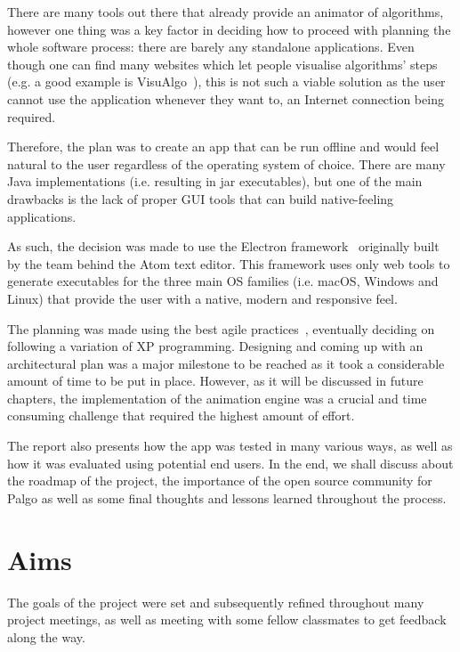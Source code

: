 \documentclass{l4proj}
\begin{document}
There are many tools out there that already provide an animator of algorithms, however one thing was a key factor in deciding
how to proceed with planning the whole software process: there are barely any standalone applications. Even though one
can find many websites which let people visualise algorithms' steps (e.g. a good example is VisuAlgo~\cite{visualgo}), this is not such a viable solution as the user cannot use the application whenever they want to, an Internet connection being required.

Therefore, the plan was to create an app that can be run offline and would feel natural to the user regardless of the operating system of choice. There are many Java implementations (i.e. resulting in jar executables), but one of the main drawbacks is the lack of proper GUI tools that can build native-feeling applications.

As such, the decision was made to use the Electron framework~\cite{electron} originally built by the team behind the Atom text editor.
This framework uses only web tools to generate executables for the three main OS families (i.e. macOS, Windows and Linux) that provide the user with a native, modern and responsive feel.

The planning was made using the best agile practices~\cite{agile-methodologies}, eventually deciding on following a variation of XP programming. Designing and coming up with an architectural plan was a major milestone to be reached as it took a considerable amount of time to be put in place. However, as it will be discussed in future chapters, the implementation of the animation engine was a crucial and time consuming challenge that required the highest amount of effort.

The report also presents how the app was tested in many various ways, as well as how it was evaluated using potential
end users. In the end, we shall discuss about the roadmap of the project, the importance of the open source community
for Palgo as well as some final thoughts and lessons learned throughout the process.

\section{Aims}

The goals of the project were set and subsequently refined throughout many project meetings, as well as meeting with some fellow classmates to get feedback along the way.
\end{document}
